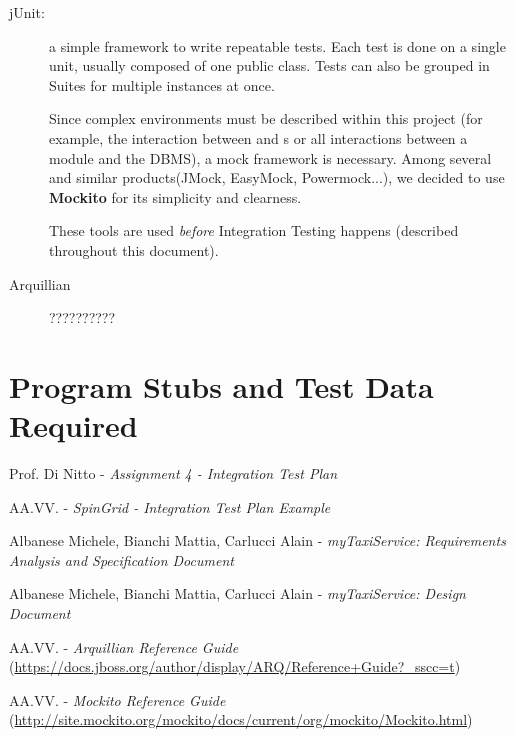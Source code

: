\documentclass[a4paper, 12pt]{article}
\begin{document}
\begin{description}
    \item[jUnit:] a simple framework to write repeatable tests. Each test is done on a single unit, usually composed of one public class. Tests can also be grouped in Suites for multiple instances at once.

    Since complex environments must be described within this project (for example, the interaction between  and s or all interactions between a module and the DBMS), a mock framework is necessary. Among several and similar products(JMock, EasyMock, Powermock...), we decided to use \textbf{Mockito} for its simplicity and clearness.

    These tools are used \emph{before} Integration Testing happens (described throughout this document).

    \item[Arquillian] ??????????
\end{description}

\newpage
\section{Program Stubs and Test Data Required}
\label{sub:program_stubs_and_test_data_required}

\appendix

\clearpage
{}

\begin{thebibliography}{9}
    Prof. Di Nitto - \emph{Assignment 4 - Integration Test Plan}

    AA.VV. - \emph{SpinGrid - Integration Test Plan Example}

        Albanese Michele, Bianchi Mattia, Carlucci Alain - \emph{myTaxiService: Requirements Analysis and Specification Document}

        Albanese Michele, Bianchi Mattia, Carlucci Alain - \emph{myTaxiService: Design Document}

        AA.VV. - \emph{Arquillian Reference Guide} {\small(\url{https://docs.jboss.org/author/display/ARQ/Reference+Guide?_sscc=t})}

        AA.VV. - \emph{Mockito Reference Guide} {\small(\url{http://site.mockito.org/mockito/docs/current/org/mockito/Mockito.html})}
\end{thebibliography}

\vfill

\end{document}
